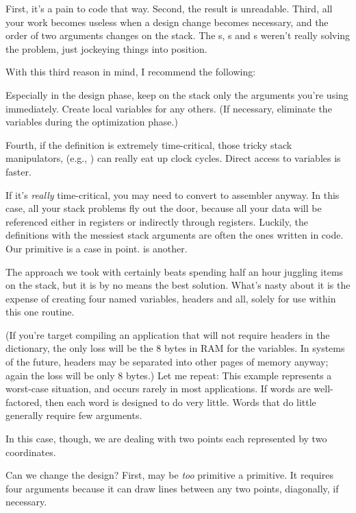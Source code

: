 First, it's a pain to code that way. Second, the result is unreadable.
Third, all your work becomes useless when a design change becomes
necessary, and the order of two arguments changes on the stack. The
s, s and s weren't really solving the
problem, just jockeying things into position.

With this third reason in mind, I recommend the following:

\begin{tip}
Especially in the design phase, keep on the stack only the arguments you're
using immediately. Create local variables for any others. (If necessary,
eliminate the variables during the optimization phase.)
\end{tip}
Fourth, if the definition is extremely time-critical, those tricky stack
manipulators, (e.g., ) can really eat up clock cycles.
Direct access to variables is faster.

If it's \emph{really} time-critical, you may need to convert to assembler
anyway. In this case, all your stack problems fly out the door, because
all your data will be referenced either in registers or indirectly through
registers. Luckily, the definitions with the messiest stack arguments are
often the ones written in code. Our \forth{[BOX]} primitive is a case in
point.   is another.

The approach we took with \forth{[BOX]} certainly beats spending half an
hour juggling items on the stack, but it is by no means the best solution.
What's nasty about it is the expense of creating four named variables,
headers and all, solely for use within this one routine.

(If you're target compiling an application that will not require headers
in the dictionary, the only loss will be the 8 bytes in RAM for the
variables. In \Forth{} systems of the future, headers may be separated
into other pages of memory anyway; again the loss will be only 8 bytes.)
Let me repeat: This example represents a worst-case situation, and occurs
rarely in most \Forth{} applications. If words are well-factored, then
each word is designed to do very little. Words that do little generally
require few arguments.

In this case, though, we are dealing with two points each represented
by two coordinates.

Can we change the design? First,  may be \emph{too} primitive a
primitive. It requires four arguments because it can draw lines between
any two points, diagonally, if necessary.

